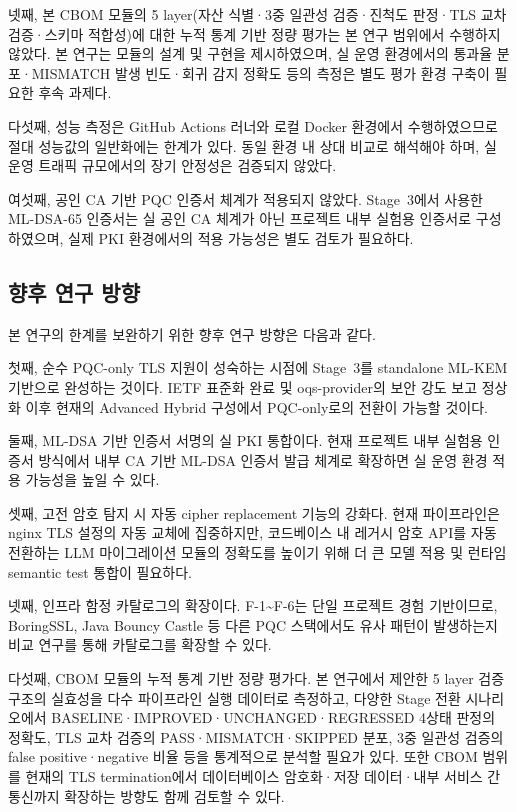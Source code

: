 넷째, 본 CBOM 모듈의 5 layer(자산 식별·3중 일관성 검증·진척도 판정·TLS 교차 검증·스키마 적합성)에 대한 누적 통계 기반 정량 평가는 본 연구 범위에서 수행하지 않았다.
본 연구는 모듈의 설계 및 구현을 제시하였으며, 실 운영 환경에서의 통과율 분포·MISMATCH 발생 빈도·회귀 감지 정확도 등의 측정은 별도 평가 환경 구축이 필요한 후속 과제다.

다섯째, 성능 측정은 GitHub Actions 러너와 로컬 Docker 환경에서 수행하였으므로 절대 성능값의 일반화에는 한계가 있다.
동일 환경 내 상대 비교로 해석해야 하며, 실 운영 트래픽 규모에서의 장기 안정성은 검증되지 않았다.

여섯째, 공인 CA 기반 PQC 인증서 체계가 적용되지 않았다.
Stage~3에서 사용한 ML-DSA-65 인증서는 실 공인 CA 체계가 아닌 프로젝트 내부 실험용 인증서로 구성하였으며, 실제 PKI 환경에서의 적용 가능성은 별도 검토가 필요하다.

\subsection{향후 연구 방향}

본 연구의 한계를 보완하기 위한 향후 연구 방향은 다음과 같다.

첫째, 순수 PQC-only TLS 지원이 성숙하는 시점에 Stage~3를 standalone ML-KEM 기반으로 완성하는 것이다.
IETF 표준화 완료 및 oqs-provider의 보안 강도 보고 정상화 이후 현재의 Advanced Hybrid 구성에서 PQC-only로의 전환이 가능할 것이다.

둘째, ML-DSA 기반 인증서 서명의 실 PKI 통합이다.
현재 프로젝트 내부 실험용 인증서 방식에서 내부 CA 기반 ML-DSA 인증서 발급 체계로 확장하면 실 운영 환경 적용 가능성을 높일 수 있다.

셋째, 고전 암호 탐지 시 자동 cipher replacement 기능의 강화다.
현재 파이프라인은 nginx TLS 설정의 자동 교체에 집중하지만, 코드베이스 내 레거시 암호 API를 자동 전환하는 LLM 마이그레이션 모듈의 정확도를 높이기 위해 더 큰 모델 적용 및 런타임 semantic test 통합이 필요하다.

넷째, 인프라 함정 카탈로그의 확장이다.
F-1\textasciitilde F-6는 단일 프로젝트 경험 기반이므로, BoringSSL, Java Bouncy Castle 등 다른 PQC 스택에서도 유사 패턴이 발생하는지 비교 연구를 통해 카탈로그를 확장할 수 있다.

다섯째, CBOM 모듈의 누적 통계 기반 정량 평가다.
본 연구에서 제안한 5 layer 검증 구조의 실효성을 다수 파이프라인 실행 데이터로 측정하고, 다양한 Stage 전환 시나리오에서 BASELINE·IMPROVED·UNCHANGED·REGRESSED 4상태 판정의 정확도, TLS 교차 검증의 PASS·MISMATCH·SKIPPED 분포, 3중 일관성 검증의 false positive·negative 비율 등을 통계적으로 분석할 필요가 있다.
또한 CBOM 범위를 현재의 TLS termination에서 데이터베이스 암호화·저장 데이터·내부 서비스 간 통신까지 확장하는 방향도 함께 검토할 수 있다.